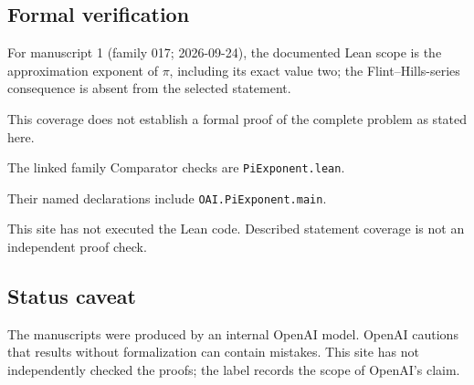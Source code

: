 \documentclass[11pt]{article}
\begin{document}
\subsection{Formal verification}
For manuscript 1 (family 017; 2026-09-24), the documented Lean scope is the approximation exponent of $\pi$, including its exact value two; the Flint--Hills-series consequence is absent from the selected statement.

This coverage does not establish a formal proof of the complete problem as stated here.

The linked family Comparator checks are \texttt{PiExponent.lean}.

Their named declarations include \texttt{OAI.PiExponent.main}.

This site has not executed the Lean code. Described statement coverage is not an independent proof check.

\subsection{Status caveat}
The manuscripts were produced by an internal OpenAI model. OpenAI cautions that results without formalization can contain mistakes. This site has not independently checked the proofs; the label records the scope of OpenAI's claim.
\end{document}
